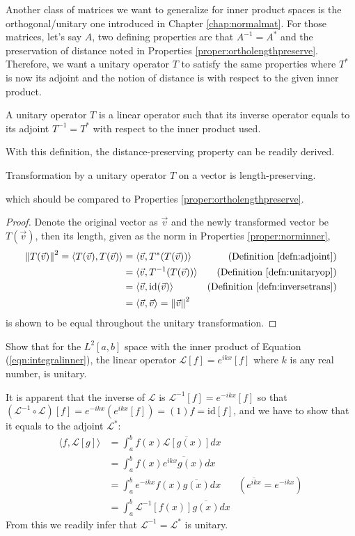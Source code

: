 Another class of matrices we want to generalize for inner product spaces is the orthogonal/unitary one introduced in Chapter \ref{chap:normalmat}. For those matrices, let's say $A$, two defining properties are that $A^{-1} = A^*$ and the preservation of distance noted in Properties \ref{proper:ortholengthpreserve}. Therefore, we want a unitary operator $T$ to satisfy the same properties where $T^*$ is now its adjoint and the notion of distance is with respect to the given inner product.
\begin{defn}
\label{defn:unitaryop}
A unitary operator $T$ is a linear operator such that its inverse operator equals to its adjoint $T^{-1} = T^*$ with respect to the inner product used.
\end{defn}
With this definition, the distance-preserving property can be readily derived.
\begin{proper}
Transformation by a unitary operator $T$ on a vector is length-preserving.
\end{proper}
which should be compared to Properties \ref{proper:ortholengthpreserve}.
\begin{proof}
Denote the original vector as $\vec{v}$ and the newly transformed vector be $T(\vec{v})$, then its length, given as the norm in Properties \ref{proper:norminner},
\begin{align*}
\norm{T(\vec{v})}^2 = \langle T(\vec{v}), T(\vec{v}) \rangle &= \langle \vec{v}, T^*(T(\vec{v})) \rangle & \text{(Definition \ref{defn:adjoint})} \\
&= \langle \vec{v}, T^{-1}(T(\vec{v})) \rangle & \text{(Definition \ref{defn:unitaryop})} \\
&= \langle \vec{v}, \text{id}(\vec{v}) \rangle & \text{(Definition \ref{defn:inversetrans})} \\
&= \langle \vec{v}, \vec{v} \rangle = \norm{\vec{v}}^2
\end{align*}
is shown to be equal throughout the unitary transformation.
\end{proof}
\begin{exmp}
Show that for the $L^2[a,b]$ space with the inner product of Equation (\ref{eqn:integralinner}), the linear operator $\mathcal{L}[f] = e^{ikx}[f]$ where $k$ is any real number, is unitary.
\end{exmp}
\begin{solution}
It is apparent that the inverse of $\mathcal{L}$ is $\mathcal{L}^{-1}[f] = e^{-ikx}[f]$ so that $(\mathcal{L}^{-1} \circ \mathcal{L})[f] = e^{-ikx}(e^{ikx}[f]) = (1)f = \text{id}[f]$, and we have to show that it equals to the adjoint $\mathcal{L}^*$:
\begin{align*}
\langle f,\mathcal{L}[g] \rangle &= \int_a^b f(x) \overline{\mathcal{L}[g(x)]} dx \\
&= \int_a^b f(x) \overline{e^{ikx}g(x)} dx \\
&= \int_a^b e^{-ikx} f(x) \overline{g(x)} dx & (\overline{e^{ikx}} = e^{-ikx}) \\
&= \int_a^b \mathcal{L}^{-1}[f(x)] \overline{g(x)} dx
\end{align*}
From this we readily infer that $\mathcal{L}^{-1} = \mathcal{L}^*$ is unitary.
\end{solution}

